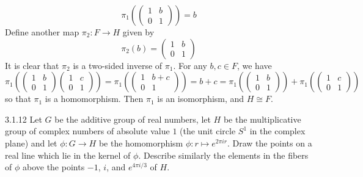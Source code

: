 \begin{solenum}
    \[
    	\pi_1\left(
        \begin{pmatrix}
            1 & b \\
            0 & 1
        \end{pmatrix}\right) = b
	\]
    Define another map $\pi_2 \colon F \to H$ given by
    \[
    	\pi_2(b) = 
        \begin{pmatrix}
            1 & b \\
            0 & 1
        \end{pmatrix}
	\]
    It is clear that $\pi_2$ is a two-sided inverse of $\pi_1$.
	For any $b, c \in F$, we have
    \[
    	\pi_1\left(
        \begin{pmatrix}
            1 & b \\
            0 & 1
        \end{pmatrix}
        \begin{pmatrix}
            1 & c \\
            0 & 1
        \end{pmatrix}\right) = 
        \pi_1\left(
        \begin{pmatrix}
            1 & b + c \\
            0 & 1
        \end{pmatrix}\right) = b + c = 
        \pi_1\left(
        \begin{pmatrix}
            1 & b \\
            0 & 1
        \end{pmatrix}\right) + 
        \pi_1\left(
        \begin{pmatrix}
            1 & c \\
            0 & 1
        \end{pmatrix}\right)
	\]
    so that $\pi_1$ is a homomorphism.
	Then $\pi_1$ is an isomorphism, and $H \cong F$.
\end{solenum}

\begin{exercise}{3.1.12}
    Let $G$ be the additive group of real numbers, let $H$ be the multiplicative group of complex numbers of absolute value $1$ (the unit circle $S^1$ in the complex plane) and let $\phi \colon G \to H$ be the homomorphism $\phi \colon r \mapsto e^{2\pi i r}$.
	Draw the points on a real line which lie in the kernel of $\phi$.
	Describe similarly the elements in the fibers of $\phi$ above the points $-1$, $i$, and $e^{4\pi i/3}$ of $H$.
\end{exercise}

